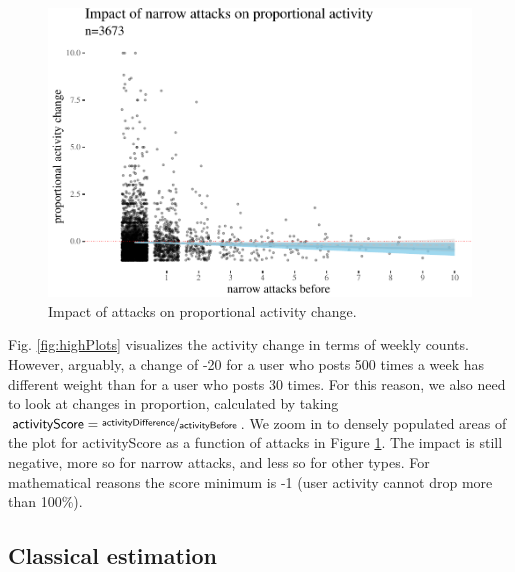 \documentclass[10pt,dvipsnames]{scrartcl}
\begin{document}
\begin{figure}[H]

\begin{center}\includegraphics[width=1\linewidth]{quittingShortAbridgedRevisions2_files/figure-latex/unnamed-chunk-7-1} \end{center}
\caption{Impact of attacks  on proportional activity change.}
\label{fig:propActivity}
\end{figure}

Fig. \ref{fig:highPlots} visualizes the activity change in terms of
weekly counts. However, arguably, a change of -20 for a user who posts
500 times a week has different weight than for a user who posts 30
times. For this reason, we also need to look at changes in proportion,
calculated by taking
\(\mathsf{activityScore} = \nicefrac{\mathsf{activityDifference}}{\mathsf{activityBefore}}\).
We zoom in to densely populated areas of the plot for
\textsf{activityScore} as a function of attacks in Figure
\ref{fig:propActivity}. The impact is still negative, more so for
\textsf{narrow} attacks, and less so for other types. For mathematical
reasons the score minimum is -1 (user activity cannot drop more than
100\%).

\subsection{Classical estimation}
\end{document}
